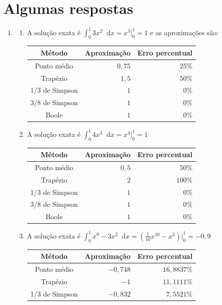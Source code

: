 \documentclass[12pt,a4paper]{article}
\newcommand*\diff{\mathop{}\!\mathrm{d}}
\begin{document}
\newpage
\section*{Algumas respostas}

\begin{enumerate}
\item
\begin{enumerate}
\item A solução exata é $\int_0^1 3x^2 \diff{x} = x^3 \Big|_0^1 = 1$ e as aproximações são:
\begin{center}
\begin{tabular}{crr}
\hline
Método         & Aproximação & Erro percentual \\ \hline
Ponto médio    & $0,75$ & $25\%$ \\
Trapézio       & $1,5$ & $50\%$ \\
1/3 de Simpson & $1$ & $0\%$ \\
3/8 de Simpson & $1$ & $0\%$ \\
Boole          & $1$ & $0\%$ \\
\hline
\end{tabular}
\end{center}
\item A solução exata é $\int_0^1 4x^3 \diff{x} = x^4 \Big|_0^1 = 1$
\begin{center}
\begin{tabular}{crr}
\hline
Método         & Aproximação & Erro percentual \\ \hline
Ponto médio    & $0,5$ & $50\%$ \\
Trapézio       & $2$ & $100\%$ \\
1/3 de Simpson & $1$ & $0\%$ \\
3/8 de Simpson & $1$ & $0\%$ \\
Boole          & $1$ & $0\%$ \\
\hline
\end{tabular}
\end{center}
\item A solução exata é $\int_0^1 x^9 - 3x^2 \diff{x}= \left(\frac{1}{10}x^{10} - x^3\right) \Big|_0^1 = -0,9$
\begin{center}
\begin{tabular}{crr}
\hline
Método         & Aproximação & Erro percentual \\ \hline
Ponto médio    & $-0,748$ &  $16,8837\%$  \\
Trapézio       & $-1$ & $11,1111\%$ \\
1/3 de Simpson & $-0,832$ & $7,5521\%$ \\

\end{tabular}
\end{center}
\end{enumerate}
\end{enumerate}
\end{document}
